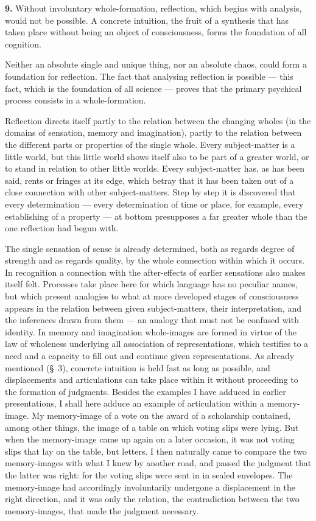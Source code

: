 \documentclass[12pt]{book}
\newcommand{\hnum}[1]{\textbf{#1.}\enspace}
\newcommand{\opage}[1]{\marginnote{\footnotesize\textit{[#1]}}}
\begin{document}
\hnum{9} Without involuntary whole-formation, reflection, which begins with
analysis, would not be possible. A concrete intuition, the fruit of a synthesis
that has taken place without being an object of consciousness, forms the
foundation of all cognition.

Neither an absolute single and unique thing, nor an absolute chaos, could form a
foundation for reflection. The fact that analysing reflection is possible ---
this fact, which is the foundation of all science --- proves that the primary
psychical process consists in a whole-formation.

Reflection directs itself partly to the relation between the changing wholes (in
the domains of sensation, memory and imagination), partly to the relation
between the different parts or properties of the single whole. Every
subject-matter is a little world, but this little world shows itself also to be
part of a greater world, or to stand in relation to other little worlds. Every
subject-matter has, as has been said, rents or fringes at its edge, which betray
that it has been taken out of a close connection with other subject-matters.
Step by step it is discovered that every determination --- every determination
of time or place, for example, every establishing of a property --- at bottom
presupposes a far greater whole than the one reflection had begun with.

The single sensation of sense is already determined, both as regards degree of
strength and as regards quality, by the whole connection within which it occurs.
In recognition a connection with the after-effects of earlier sensations also
makes itself felt. Processes take place here for which language has no peculiar
names, but which present analogies to what at more developed stages of
consciousness appears in the relation between given subject-matters, their
interpretation, and the inferences drawn from them --- an analogy that must not
be confused with identity. In \opage{24}memory and imagination whole-images are formed in
virtue of the law of wholeness underlying all association of representations,
which testifies to a need and a capacity to fill out and continue given
representations. As already mentioned (§~3), concrete intuition is held fast as
long as possible, and displacements and articulations can take place within it
without proceeding to the formation of judgments. Besides the examples I have
adduced in earlier presentations, I shall here adduce an example of articulation
within a memory-image. My memory-image of a vote on the award of a scholarship
contained, among other things, the image of a table on which voting slips were
lying. But when the memory-image came up again on a later occasion, it was not
voting slips that lay on the table, but letters. I then naturally came to compare
the two memory-images with what I knew by another road, and passed the judgment
that the latter was right: for the voting slips were sent in in sealed
envelopes. The memory-image had accordingly involuntarily undergone a
displacement in the right direction, and it was only the relation, the
contradiction between the two memory-images, that made the judgment necessary.
\end{document}
